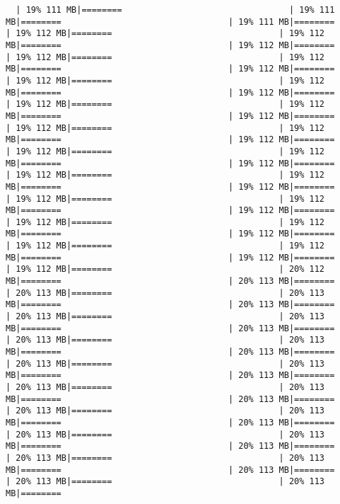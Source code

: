 \documentclass[
]{article}
\begin{document}
\begin{verbatim}
  | 19% 111 MB|========                                 | 19% 111 MB|========                                 | 19% 111 MB|========                                 | 19% 112 MB|========                                 | 19% 112 MB|========                                 | 19% 112 MB|========                                 | 19% 112 MB|========                                 | 19% 112 MB|========                                 | 19% 112 MB|========                                 | 19% 112 MB|========                                 | 19% 112 MB|========                                 | 19% 112 MB|========                                 | 19% 112 MB|========                                 | 19% 112 MB|========                                 | 19% 112 MB|========                                 | 19% 112 MB|========                                 | 19% 112 MB|========                                 | 19% 112 MB|========                                 | 19% 112 MB|========                                 | 19% 112 MB|========                                 | 19% 112 MB|========                                 | 19% 112 MB|========                                 | 19% 112 MB|========                                 | 19% 112 MB|========                                 | 19% 112 MB|========                                 | 19% 112 MB|========                                 | 19% 112 MB|========                                 | 19% 112 MB|========                                 | 19% 112 MB|========                                 | 19% 112 MB|========                                 | 19% 112 MB|========                                 | 19% 112 MB|========                                 | 19% 112 MB|========                                 | 19% 112 MB|========                                 | 20% 112 MB|========                                 | 20% 113 MB|========                                 | 20% 113 MB|========                                 | 20% 113 MB|========                                 | 20% 113 MB|========                                 | 20% 113 MB|========                                 | 20% 113 MB|========                                 | 20% 113 MB|========                                 | 20% 113 MB|========                                 | 20% 113 MB|========                                 | 20% 113 MB|========                                 | 20% 113 MB|========                                 | 20% 113 MB|========                                 | 20% 113 MB|========                                 | 20% 113 MB|========                                 | 20% 113 MB|========                                 | 20% 113 MB|========                                 | 20% 113 MB|========                                 | 20% 113 MB|========                                 | 20% 113 MB|========                                 | 20% 113 MB|========                                 | 20% 113 MB|========                                 | 20% 113 MB|========                                 | 20% 113 MB|========                                 | 20% 113 MB|========                                 | 20% 113 MB|========                                 | 20% 113 MB|========                                 | 20% 113 MB|========  
\end{verbatim}
\end{document}
